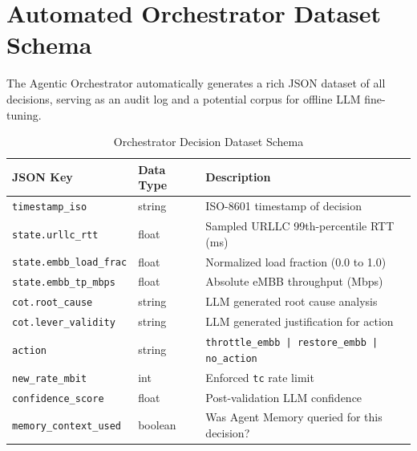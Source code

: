 \appendix

\chapter{Automated Orchestrator Dataset Schema}

The Agentic Orchestrator automatically generates a rich JSON dataset of all decisions, serving as an audit log and a potential corpus for offline LLM fine-tuning.

\begin{table}[H]
\centering
\caption{Orchestrator Decision Dataset Schema}
\label{tab:dataset}
\begin{tabular}{lll}
\toprule
\textbf{JSON Key} & \textbf{Data Type} & \textbf{Description} \\
\midrule
\texttt{timestamp\_iso}       & string   & ISO-8601 timestamp of decision \\
\texttt{state.urllc\_rtt}     & float    & Sampled URLLC 99th-percentile RTT (ms) \\
\texttt{state.embb\_load\_frac}& float    & Normalized load fraction (0.0 to 1.0) \\
\texttt{state.embb\_tp\_mbps} & float    & Absolute eMBB throughput (Mbps) \\
\texttt{cot.root\_cause}      & string   & LLM generated root cause analysis \\
\texttt{cot.lever\_validity}  & string   & LLM generated justification for action \\
\texttt{action}               & string   & \texttt{throttle\_embb | restore\_embb | no\_action} \\
\texttt{new\_rate\_mbit}      & int      & Enforced \texttt{tc} rate limit \\
\texttt{confidence\_score}    & float    & Post-validation LLM confidence \\
\texttt{memory\_context\_used}& boolean  & Was Agent Memory queried for this decision? \\
\bottomrule
\end{tabular}
\end{table}


